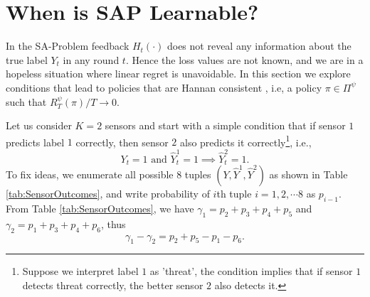 \documentclass{article}
\begin{document}
\section{When is SAP Learnable?}
In the SA-Problem feedback $H_t(\cdot)$ does not reveal any information about the true label $Y_t$ in any round $t$. Hence the loss values are not known, and we are in a hopeless situation where linear regret is unavoidable. In this section we explore conditions that lead to policies that are Hannan consistent \cite{Hannan1957_HannanConsistency_Hannan}, i.e, a policy $\pi\in \Pi^\psi$ such that $R_T^\psi (\pi)/T \rightarrow 0$.

Let us consider $K=2$ sensors and start with a simple condition that if sensor $1$ predicts label $1$ correctly, then sensor $2$ also predicts it correctly\footnote{Suppose we interpret label $1$ as 'threat', the condition implies that if sensor $1$ detects threat correctly, the better sensor $2$ also detects it. }, i.e.,
\begin{equation}
\label{eqn:PathDominace1} 
Y_t=1 \mbox{ and } \hat{Y}_t^1=1 \implies \hat{Y}^2_t=1. 
\end{equation}
To fix ideas, we enumerate all possible $8$ tuples $(Y, \hat{Y}^1, \hat{Y}^2)$ as shown in Table \ref{tab:SensorOutcomes}, and write probability of $i$th tuple $i=1,2,\cdots 8$ as $p_{i-1}$.  From Table \ref{tab:SensorOutcomes}, we have  $\gamma_1=p_2+p_3+p_4+p_5$ and $\gamma_2=p_1+p_3+p_4+p_6$, thus
\begin{equation}
	\gamma_1-\gamma_2 = p_2+p_5-p_1-p_6.
\end{equation}
\end{document}

